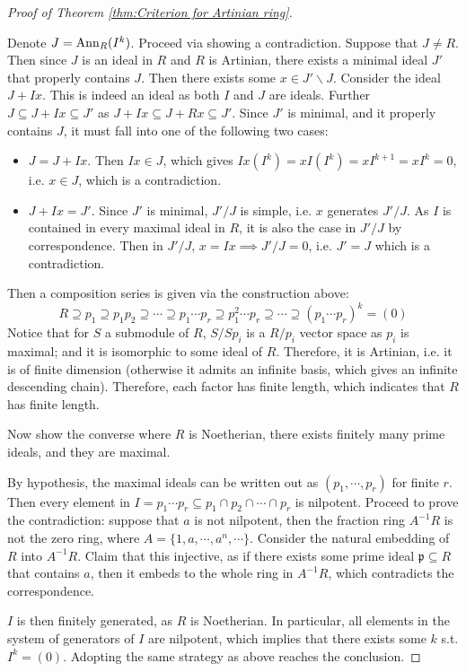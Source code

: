 \begin{proof}[Proof of Theorem \ref{thm:Criterion for Artinian ring}]
\begin{enumerate}[label=\roman*)]
        Denote $J = \mathrm{Ann}_{R}(I^k)$. Proceed via showing a contradiction. Suppose that $J \neq R$. Then since $J$ is an ideal in $R$ and $R$ is Artinian, there exists a minimal ideal $J'$ that properly contains $J$. Then there exists some $x\in J'\smallsetminus J$. Consider the ideal $J + Ix$. This is indeed an ideal as both $I$ and $J$ are ideals. Further $J \subseteq J + Ix \subseteq J'$ as $J + Ix \subseteq J + Rx \subseteq J'$. Since $J'$ is minimal, and it properly contains $J$, it must fall into one of the following two cases:
        \begin{itemize}
            \item $J = J + Ix$. Then $Ix \in J$, which gives $Ix(I^k) = xI(I^k) = xI^{k+1} = xI^k = 0$, i.e. $x\in J$, which is a contradiction.
            \item $J + Ix = J'$. Since $J'$ is minimal, $J'/J$ is simple, i.e. $x$ generates $J'/J$. As $I$ is contained in every maximal ideal in $R$, it is also the case in $J'/J$ by correspondence. Then in $J'/J$, $x = Ix \implies J'/J = 0$, i.e. $J' = J$ which is a contradiction.
        \end{itemize}
        Then a composition series is given via the construction above:
        \[
            R \supseteq p_1\supseteq p_1 p_2 \supseteq \cdots \supseteq p_1\cdots p_r \supseteq p_1^2\cdots p_r \supseteq \cdots \supseteq (p_1\cdots p_r)^k = (0)
        \]
        Notice that for $S$ a submodule of $R$, $S/Sp_i$ is a $R/p_i$ vector space as $p_i$ is maximal; and it is isomorphic to some ideal of $R$. Therefore, it is Artinian, i.e. it is of finite dimension (otherwise it admits an infinite basis, which gives an infinite descending chain). Therefore, each factor has finite length, which indicates that $R$ has finite length.
    \end{enumerate}
    Now show the converse where $R$ is Noetherian, there exists finitely many prime ideals, and they are maximal. 

    By hypothesis, the maximal ideals can be written out as $(p_1, \cdots, p_r)$ for finite $r$. Then every element in $I = p_1\cdots p_r \subseteq p_1 \cap p_2 \cap \cdots \cap p_r$ is nilpotent. Proceed to prove the contradiction: suppose that $a$ is not nilpotent, then the fraction ring $A^{-1} R$ is not the zero ring, where $A = \{ 1, a, \cdots, a^n, \cdots \}$. Consider the natural embedding of $R$ into $A^{-1}R$. Claim that this injective, as if there exists some prime ideal $\mathfrak{p} \subseteq R$ that contains $a$, then it embeds to the whole ring in $A^{-1}R$, which contradicts the correspondence. 

    $I$ is then finitely generated, as $R$ is Noetherian. In particular, all elements in the system of generators of $I$ are nilpotent, which implies that there exists some $k$ s.t. $I^k = (0)$. Adopting the same strategy as above reaches the conclusion.
\end{proof}

